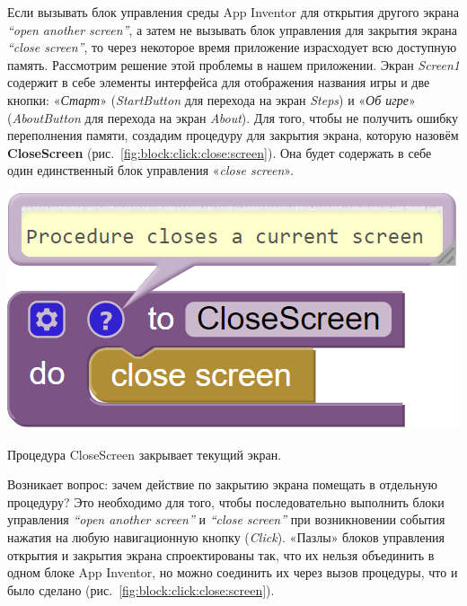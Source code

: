 Если вызывать блок управления среды App Inventor для открытия другого экрана \textit{``open another screen''}, а затем не вызывать блок управления для закрытия экрана \textit{``close screen''}, то через некоторое время приложение израсходует всю доступную память.
Рассмотрим решение этой проблемы в нашем приложении. Экран \textit{Screen1} содержит в себе элементы интерфейса для отображения названия игры и две кнопки: «\textit{Старт}» (\textit{StartButton} для перехода на экран \textit{Steps}) и «\textit{Об игре}» (\textit{AboutButton} для перехода на экран \textit{About}). Для того, чтобы не получить ошибку переполнения памяти, создадим процедуру для закрытия экрана, которую назовём \textbf{CloseScreen} (рис.~\ref{fig:block:click:close:screen}). Она будет содержать в себе один единственный блок управления «\textit{close screen}». 
\begin{marginfigure}[-2em]
  \includegraphics{./graphics/programs/guess_numbers/procedure_closeScreen_AppInventor_2018.png}
    \caption[Процедура CloseScreen.]{Процедура CloseScreen закрывает текущий экран.}
  \label{fig:block:click:close:screen}
\end{marginfigure}
Возникает вопрос: зачем действие по закрытию экрана помещать в отдельную процедуру? Это необходимо для того, чтобы последовательно выполнить блоки управления \textit{``open another screen''} и \textit{``close screen''} при возникновении события нажатия на любую навигационную кнопку (\textit{Click}). «Пазлы» блоков управления открытия и закрытия экрана спроектированы так, что их нельзя объединить в одном блоке App Inventor, но можно соединить их через вызов процедуры, что и было сделано (рис.~\ref{fig:block:click:close:screen}).
